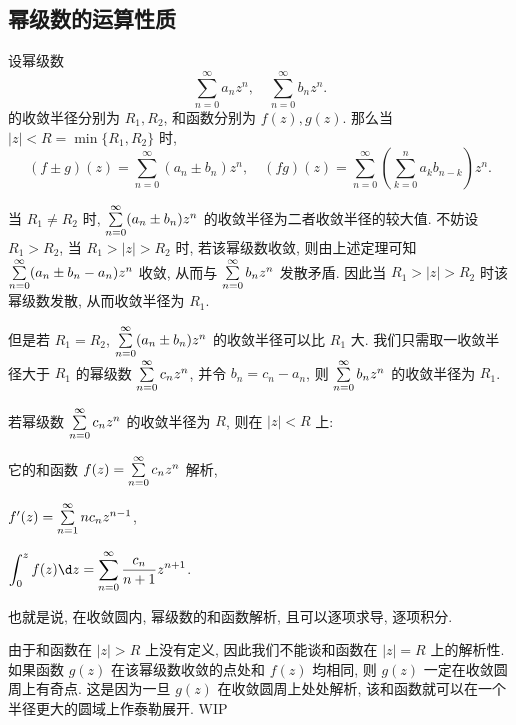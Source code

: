 \subsection{幂级数的运算性质}

\begin{theorem}
	设幂级数
	\[
		\sum_{n=0}^\infty a_nz^n,\quad
		\sum_{n=0}^\infty b_nz^n.
	\]
	的收敛半径分别为 $R_1,R_2$, 和函数分别为 $f(z),g(z)$.
	那么当 $|z|<R=\min\{R_1,R_2\}$ 时,
	\[
		(f\pm g)(z)=\sum_{n=0}^\infty (a_n\pm b_n)z^n,\quad
		(fg)(z)=\sum_{n=0}^\infty\left(\sum_{k=0}^na_kb_{n-k}\right)z^n.
	\]
\end{theorem}

当 $R_1\neq R_2$ 时, $\sum\limits_{n=0}^\infty (a_n\pm b_n)z^n$ 的收敛半径为二者收敛半径的较大值.
不妨设 $R_1>R_2$, 当 $R_1>|z|>R_2$ 时, 若该幂级数收敛, 则由上述定理可知 $\sum\limits_{n=0}^\infty (a_n\pm b_n-a_n)z^n$ 收敛, 从而与 $\sum\limits_{n=0}^\infty b_nz^n$ 发散矛盾.
因此当 $R_1>|z|>R_2$ 时该幂级数发散, 从而收敛半径为 $R_1$.

但是若 $R_1=R_2$, $\sum\limits_{n=0}^\infty (a_n\pm b_n)z^n$ 的收敛半径可以比 $R_1$ 大. 我们只需取一收敛半径大于 $R_1$ 的幂级数 $\sum\limits_{n=0}^\infty c_nz^n$, 并令 $b_n=c_n-a_n$, 则 $\sum\limits_{n=0}^\infty b_nz^n$ 的收敛半径为 $R_1$.


\begin{theorem}
	若幂级数 $\sum\limits_{n=0}^\infty c_nz^n$ 的收敛半径为 $R$, 则在 $|z|<R$ 上:
	\begin{enumpar}
		\item 它的和函数 $f(z)=\sum\limits_{n=0}^\infty c_nz^n$ 解析,
		\item $f'(z)=\sum\limits_{n=1}^\infty nc_nz^{n-1}$,
		\item $\displaystyle\int_0^zf(z)\d z=\sum_{n=0}^\infty \frac{c_n}{n+1}z^{n+1}$.
	\end{enumpar}
\end{theorem}

也就是说, \alert{在收敛圆内, 幂级数的和函数解析, 且可以逐项求导, 逐项积分}.

由于和函数在 $|z|>R$ 上没有定义, 因此我们不能谈和函数在 $|z|=R$ 上的解析性.
如果函数 $g(z)$ 在该幂级数收敛的点处和 $f(z)$ 均相同, 则 $g(z)$ \alert{一定在收敛圆周上有奇点}.
这是因为一旦 $g(z)$ 在收敛圆周上处处解析, 该和函数就可以在一个半径更大的圆域上作泰勒展开.
WIP


